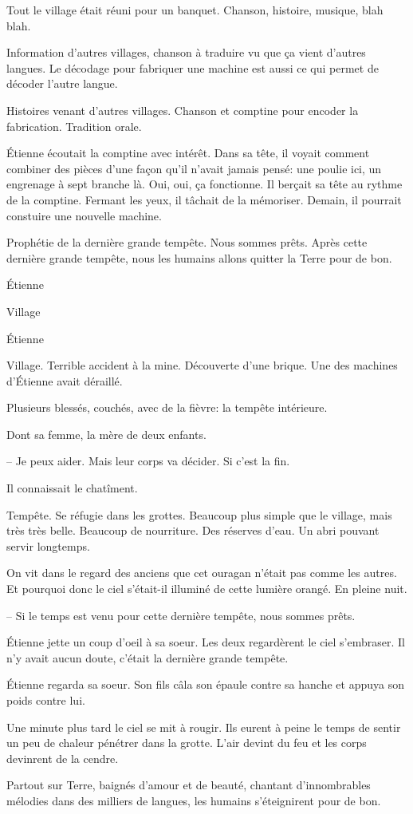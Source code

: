 Tout le village était réuni pour un banquet. Chanson, histoire, musique, blah blah.

Information d'autres villages, chanson à traduire vu que ça vient d'autres langues.
Le décodage pour fabriquer une machine est aussi ce qui permet de décoder l'autre langue.

Histoires venant d'autres villages. Chanson et comptine pour encoder la fabrication. 
Tradition orale.

Étienne écoutait la comptine avec intérêt. Dans sa tête, il voyait comment combiner des pièces d'une
façon qu'il n'avait jamais pensé: une poulie ici, un engrenage à sept branche là. Oui, oui, ça fonctionne.
Il berçait sa tête au rythme de la comptine. Fermant les yeux, il tâchait de la mémoriser.
Demain, il pourrait constuire une nouvelle machine.

Prophétie de la dernière grande tempête. Nous sommes prêts.
Après cette dernière grande tempête, nous les humains allons quitter la Terre pour de bon.

\sautSection{}

Étienne 

\sautSection{}

Village 

\sautSection{}

Étienne

\sautSection{}

Village. Terrible accident à la mine. Découverte d'une brique.
Une des machines d'Étienne avait déraillé.

Plusieurs blessés, couchés, avec de la fièvre: la tempête intérieure.

Dont sa femme, la mère de deux enfants.

-- Je peux aider. Mais leur corps va décider. Si c'est la fin.


Il connaissait le chatîment.

\sautSection{}

Tempête. Se réfugie dans les grottes. Beaucoup plus simple que le village, mais très très belle.
Beaucoup de nourriture. Des réserves d'eau. Un abri pouvant servir longtemps.


On vit dans le regard des anciens que cet ouragan n'était pas comme les autres.
Et pourquoi donc le ciel s'était-il illuminé de cette lumière orangé. En pleine nuit.

-- Si le temps est venu pour cette dernière tempête, nous sommes prêts.

Étienne jette un coup d'oeil à sa soeur. Les deux regardèrent le ciel s'embraser.
Il n'y avait aucun doute, c'était la dernière grande tempête.

Étienne regarda sa soeur. Son fils câla son épaule contre sa hanche et appuya son poids contre lui.

Une minute plus tard le ciel se mit à rougir.  
%
Ils eurent à peine le temps de
sentir un peu de chaleur pénétrer dans la grotte. 
%
L'air devint du feu et les
corps devinrent de la cendre.

Partout sur Terre, baignés d'amour et de beauté, chantant d'innombrables mélodies dans des milliers de langues,
les humains s'éteignirent pour de bon.


